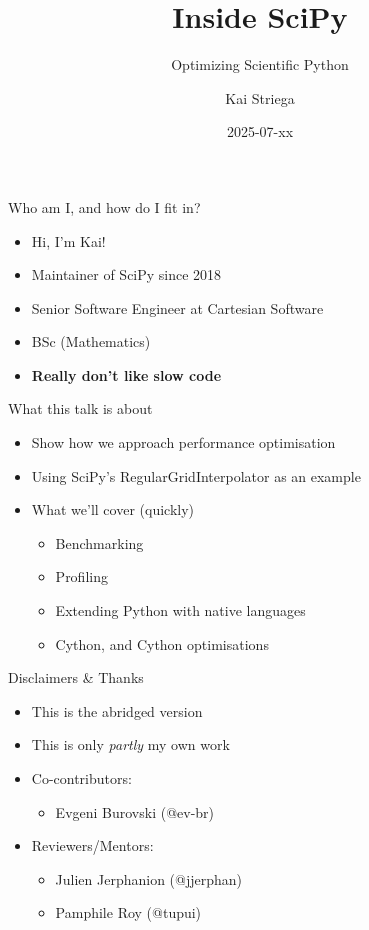 \documentclass[12pt,xcolor=dvipsnames]{beamer}
\title{Inside SciPy}
\subtitle{Optimizing Scientific Python}
\date{2025-07-xx}
\author{Kai Striega}
\institute{Cartesian Software \& SciPy}
\begin{document}
    \maketitle
    \begin{frame}{Who am I, and how do I fit in?}
        \begin{itemize}
            \item Hi, I'm Kai!
            \item Maintainer of SciPy since 2018
            \item Senior Software Engineer at Cartesian Software
            \item BSc (Mathematics)
            \item \textbf{Really don't like slow code}
        \end{itemize}
    \end{frame}

    \begin{frame}{What this talk is about}
        \begin{itemize}
            \item Show how we approach performance optimisation
            \item Using SciPy’s RegularGridInterpolator as an example
            \item What we'll cover (quickly)
            \begin{itemize}
                \item Benchmarking
                \item Profiling
                \item Extending Python with native languages
                \item Cython, and Cython optimisations
            \end{itemize}
        \end{itemize}
    \end{frame}

    \begin{frame}{Disclaimers \& Thanks}
        \begin{itemize}
            \item<1-> This is the abridged version
            \item<2-> This is only \textit{partly} my own work
            \item<3-> Co-contributors:
            \begin{itemize}
                \item Evgeni Burovski (@ev-br)
            \end{itemize}
            \item<4-> Reviewers/Mentors:
            \begin{itemize}
                \item Julien Jerphanion (@jjerphan)
                \item Pamphile Roy (@tupui)
            \end{itemize}
        \end{itemize}
    \end{frame}
\end{document}
